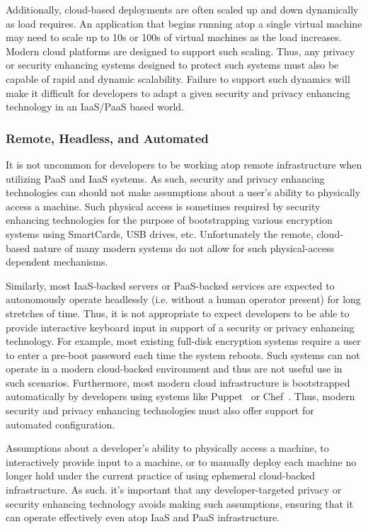 Additionally, cloud-based deployments are often scaled up and down
dynamically as load requires. An application that begins running atop
a single virtual machine may need to scale up to 10s or 100s of
virtual machines as the load increases. Modern cloud platforms are
designed to support such scaling. Thus, any privacy or security
enhancing systems designed to protect such systems must also be
capable of rapid and dynamic scalability. Failure to support such
dynamics will make it difficult for developers to adapt a given
security and privacy enhancing technology in an IaaS/PaaS based world.

\subsubsection{Remote, Headless, and Automated}

It is not uncommon for developers to be working atop remote
infrastructure when utilizing PaaS and IaaS systems. As such, security
and privacy enhancing technologies can should not make assumptions
about a user's ability to physically access a machine. Such physical
access is sometimes required by security enhancing technologies for
the purpose of bootstrapping various encryption systems using
SmartCards, USB drives, etc. Unfortunately the remote, cloud-based
nature of many modern systems do not allow for such physical-access
dependent mechanisms.

Similarly, most IaaS-backed servers or PaaS-backed services are
expected to autonomously operate headlessly (i.e. without a human
operator present) for long stretches of time. Thus, it is not
appropriate to expect developers to be able to provide interactive
keyboard input in support of a security or privacy enhancing
technology. For example, most existing full-disk encryption systems
require a user to enter a pre-boot password each time the system
reboots. Such systems can not operate in a modern cloud-backed
environment and thus are not useful use in such
scenarios. Furthermore, most modern cloud infrastructure is
bootstrapped automatically by developers using systems like
Puppet~\cite{puppet} or Chef~\cite{chef}. Thus, modern security and
privacy enhancing technologies must also offer support for automated
configuration.

Assumptions about a developer's ability to physically access a
machine, to interactively provide input to a machine, or to manually
deploy each machine no longer hold under the current practice of using
ephemeral cloud-backed infrastructure. As such. it's important that
any developer-targeted privacy or security enhancing technology avoids
making such assumptions, ensuring that it can operate effectively even
atop IaaS and PaaS infrastructure.

